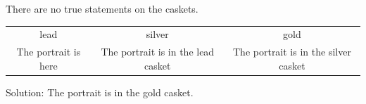 There are no true statements on the caskets.
\begin{tabular}{ccc}
\toprule
lead & silver & gold\\
The portrait is here & The portrait is in the lead casket & The portrait is in the silver casket\\
\bottomrule
\end{tabular}
Solution: The portrait is in the gold casket.